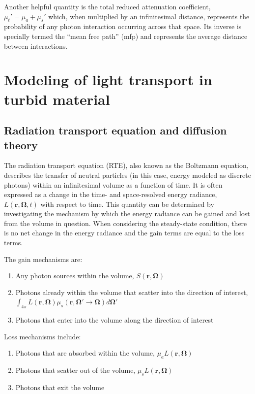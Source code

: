 Another helpful quantity is the total reduced attenuation coefficient, $\mu_t'=\mu_a + \mu_s'$ which, when multiplied by an infinitesimal distance, represents the probability of any photon interaction occurring across that space. Its inverse is specially termed the ``mean free path'' (mfp) and represents the average distance between interactions.\cite{Farrell2003}

\section{Modeling of light transport in turbid material}

\subsection{Radiation transport equation and diffusion theory}
The radiation transport equation (RTE), also known as the Boltzmann equation, describes the transfer of neutral particles (in this case, energy modeled as discrete photons) within an infinitesimal volume as a function of time.\cite{Duderstadt1976} It is often expressed as a change in the time- and space-resolved energy radiance, $L(\mathbf{r},\mathbf{\Omega},t)$ with respect to time. This quantity can be determined by investigating the mechanism by which the energy radiance can be gained and lost from the volume in question. When considering the steady-state condition, there is no net change in the energy radiance and the gain terms are equal to the loss terms.

\noindent The gain mechanisms are:
\begin{enumerate}
	\item Any photon sources within the volume, $ S(\mathbf{r},\mathbf{\Omega}) $
	\item Photons already within the volume that scatter into the direction of interest,  $\int_{4\pi} L(\mathbf{r},\mathbf{\Omega}) \mu_s(\mathbf{r},\mathbf{\Omega}' \rightarrow \mathbf{\Omega}) d \mathbf{\Omega'} $
	\item Photons that enter into the volume along the direction of interest
\end{enumerate}

\noindent Loss mechanisms include:
\begin{enumerate}
	\item Photons that are absorbed within the volume, $ \mu_a L(\mathbf{r},\mathbf{\Omega}) $
	\item Photons that scatter out of the volume, $ \mu_s L(\mathbf{r},\mathbf{\Omega}) $
	\item Photons that exit the volume
\end{enumerate}

